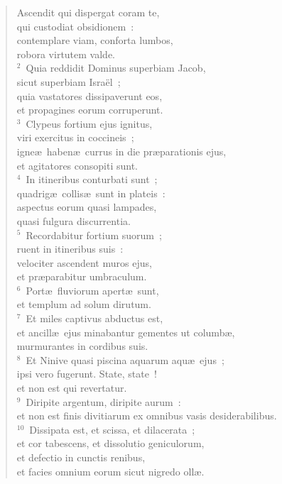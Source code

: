 \begin{flushleft}\begin{verse}\vspace{-19pt}Ascendit qui dispergat coram te,\\ qui custodiat obsidionem~:\\ contemplare viam, conforta lumbos,\\ robora virtutem valde.\\
${}^{2}$~Quia reddidit Dominus superbiam Jacob,\\ sicut superbiam Isra\"el~;\\ quia vastatores dissipaverunt eos,\\ et propagines eorum corruperunt.\\
${}^{3}$~Clypeus fortium ejus ignitus,\\ viri exercitus in coccineis~;\\ igne\ae\ haben\ae\ currus in die pr\ae parationis ejus,\\ et agitatores consopiti sunt.\\
${}^{4}$~In itineribus conturbati sunt~;\\ quadrig\ae\ collis\ae\ sunt in plateis~:\\ aspectus eorum quasi lampades,\\ quasi fulgura discurrentia.\\
${}^{5}$~Recordabitur fortium suorum~;\\ ruent in itineribus suis~:\\ velociter ascendent muros ejus,\\ et pr\ae parabitur umbraculum.\\
${}^{6}$~Port\ae\ fluviorum apert\ae\ sunt,\\ et templum ad solum dirutum.\\
${}^{7}$~Et miles captivus abductus est,\\ et ancill\ae\ ejus minabantur gementes ut columb\ae ,\\ murmurantes in cordibus suis.\\
${}^{8}$~Et Ninive quasi piscina aquarum aqu\ae\ ejus~;\\ ipsi vero fugerunt. State, state~!\\ et non est qui revertatur.\\
${}^{9}$~Diripite argentum, diripite aurum~:\\ et non est finis divitiarum ex omnibus vasis desiderabilibus.\\
${}^{10}$~Dissipata est, et scissa, et dilacerata~;\\ et cor tabescens, et dissolutio geniculorum,\\ et defectio in cunctis renibus,\\ et facies omnium eorum sicut nigredo oll\ae .\\

\end{verse}
\end{flushleft}

